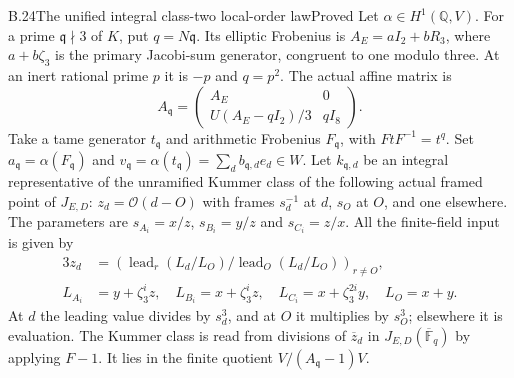 \begin{statement}{B.24}{The unified integral class-two local-order law}{Proved}
Let $\alpha\in H^1(\mathbb Q,V)$. For a prime
$\mathfrak q\nmid3$ of $K$, put $q=N\mathfrak q$.
Its elliptic Frobenius is
$A_E=aI_2+bR_3$, where $a+b\zeta_3$ is the primary
Jacobi-sum generator, congruent to one modulo three.
At an inert rational prime $p$ it is $-p$ and $q=p^2$.
The actual affine matrix is
\[
 A_{\mathfrak q}=
 \begin{pmatrix}
 A_E&0\\ U(A_E-qI_2)/3&qI_8
 \end{pmatrix}.                                                \tag{B.24.3}
\]
Take a tame generator $t_{\mathfrak q}$ and arithmetic
Frobenius $F_{\mathfrak q}$, with $FtF^{-1}=t^q$.
Set $a_{\mathfrak q}=\alpha(F_{\mathfrak q})$ and
$v_{\mathfrak q}=\alpha(t_{\mathfrak q})
 =\sum_d b_{\mathfrak q,d}e_d\in W$.
Let $k_{\mathfrak q,d}$ be an integral representative of
the unramified Kummer class of the following actual framed
point of $J_{E,D}$: $z_d=\mathcal O(d-O)$ with frames
$s_d^{-1}$ at $d$, $s_O$ at $O$, and one elsewhere.
The parameters are $s_{A_i}=x/z$, $s_{B_i}=y/z$ and
$s_{C_i}=z/x$. All the finite-field input is given by
\[
 \begin{split}
 3z_d&=\left(
   \operatorname{lead}_r(L_d/L_O)/
   \operatorname{lead}_O(L_d/L_O)\right)_{r\ne O},\\
 L_{A_i}&=y+\zeta_3^iz,\quad
 L_{B_i}=x+\zeta_3^iz,\quad
 L_{C_i}=x+\zeta_3^{2i}y,\quad L_O=x+y.
 \end{split}                                                    \tag{B.24.4}
\]
At $d$ the leading value divides by $s_d^3$, and at
$O$ it multiplies by $s_O^3$; elsewhere it is evaluation.
The Kummer class is read from divisions of $\overline z_d$
in $J_{E,D}(\overline{\mathbb F}_q)$ by applying $F-1$.
It lies in the finite quotient $V/(A_{\mathfrak q}-1)V$.


\end{statement}
